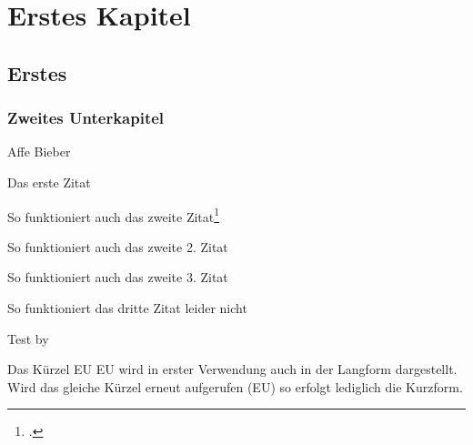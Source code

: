 \chapter{Erstes Kapitel}                %
\section{Erstes}                        %
\subsection{Zweites Unterkapitel}       %

Affe
Bieber

Das erste Zitat\par                                 %
So funktioniert auch das zweite Zitat\footcite{aristotle:physics}\par               %
So funktioniert auch das zweite 2. Zitat \cite{aristotle:physics}\par               %
So funktioniert auch das zweite 3. Zitat \autocite[80]{aristotle:physics}\par       %
So funktioniert das dritte Zitat leider nicht \autocite{aristotle:physics}\par      %
Test \citeyear{aristotle:physics} by \citeauthor{aristotle:physics}                 %

Das K\"urzel EU \ac{EU} wird in erster Verwendung auch in der Langform dargestellt.
Wird das gleiche K\"urzel erneut aufgerufen (\ac{EU}) so erfolgt lediglich die Kurzform.

\begin{figure}
    \centering
\end{figure}

